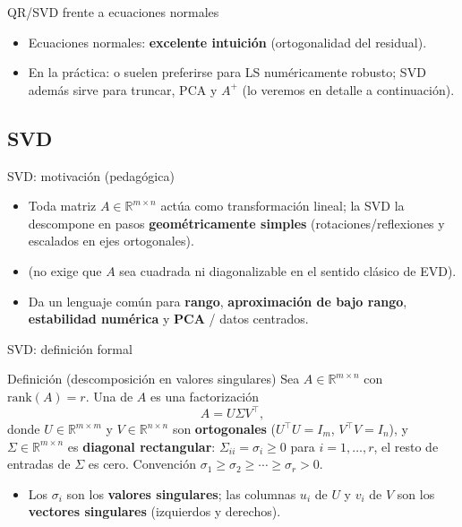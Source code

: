 \begin{frame}{QR/SVD frente a ecuaciones normales}
\begin{itemize}\small
  \item Ecuaciones normales: \textbf{excelente intuición} (ortogonalidad del residual).
  \item En la práctica:  o  suelen preferirse para LS numéricamente robusto; SVD además sirve para truncar, PCA y \(A^+\) (lo veremos en detalle a continuación).
\end{itemize}
\end{frame}

\subsection{SVD}

\begin{frame}{SVD: motivación (pedagógica)}
\begin{itemize}\small
  \item Toda matriz \(A\in\mathbb{R}^{m\times n}\) actúa como transformación lineal; la SVD la descompone en pasos \textbf{geométricamente simples} (rotaciones/reflexiones y escalados en ejes ortogonales).
  \item {} (no exige que \(A\) sea cuadrada ni diagonalizable en el sentido clásico de EVD).
  \item Da un lenguaje común para \textbf{rango}, \textbf{aproximación de bajo rango}, \textbf{estabilidad numérica} y \textbf{PCA} / datos centrados.
\end{itemize}
\end{frame}

\begin{frame}{SVD: definición formal}
\begin{block}{Definición (descomposición en valores singulares)}
Sea \(A\in\mathbb{R}^{m\times n}\) con \(\mathrm{rank}(A)=r\). Una  de \(A\) es una factorización
\[
  A = U\Sigma V^\top,
\]
donde \(U\in\mathbb{R}^{m\times m}\) y \(V\in\mathbb{R}^{n\times n}\) son \textbf{ortogonales} (\(U^\top U=I_m\), \(V^\top V=I_n\)), y \(\Sigma\in\mathbb{R}^{m\times n}\) es \textbf{diagonal rectangular}: \(\Sigma_{ii}=\sigma_i\ge 0\) para \(i=1,\ldots,r\), el resto de entradas de \(\Sigma\) es cero. Convención \(\sigma_1\ge\sigma_2\ge\cdots\ge\sigma_r>0\).
\end{block}
\begin{itemize}\small
  \item Los \(\sigma_i\) son los \textbf{valores singulares}; las columnas \(u_i\) de \(U\) y \(v_i\) de \(V\) son los \textbf{vectores singulares} (izquierdos y derechos).
\end{itemize}
\end{frame}

